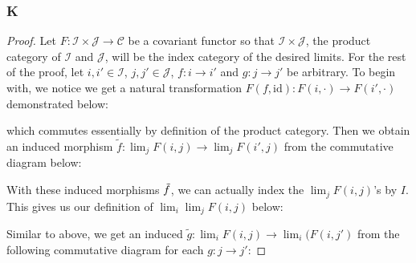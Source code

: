 \documentclass{article}
\newcommand{\id}{\mathrm{id}}
\newcommand{\fI}{\mathscr{I}}
\newcommand{\fJ}{\mathscr{J}}
\newcommand{\fC}{\mathscr{C}}
\begin{document}
\subsubsection{K}\label{1.6.K}
\begin{proof}
    Let $F:\fI\times \fJ\to \fC$ be a covariant functor so that $\fI\times \fJ$, the product category of $\fI$ and $\fJ$, will be the index category of the desired limits. For the rest of the proof, let $i,i'\in \fI$, $j,j'\in \fJ$, $f:i\to i'$ and $g:j\to j'$ be arbitrary. To begin with, we notice we get a natural transformation $F(f,\id):F(i,\cdot)\to F(i',\cdot)$ demonstrated below:
    \begin{center}
    \end{center}
    which commutes essentially by definition of the product category. Then we obtain an induced morphism $\tilde f:\lim_j F(i,j)\to \lim_j F(i',j)$ from the commutative diagram below:
    \begin{center}
    \end{center}
    With these induced morphisms $\Tilde{f}$, we can actually index the $\lim_j F(i,j)$'s by $I$. This gives us our definition of $\lim_i \lim_j F(i,j)$ below:
    \begin{center}
    \end{center}
    Similar to above, we get an induced $\tilde g:\lim_i F(i,j)\to \lim_i(F(i,j')$ from the following commutative diagram for each $g:j\to j'$:

\end{proof}
\end{document}

